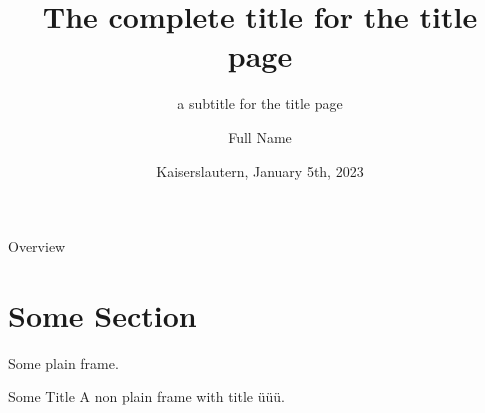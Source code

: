 \documentclass{beamer}
\title[Short Title in Foot]{The complete title for the title page}
\subtitle{a subtitle for the title page}
\date{Kaiserslautern, January 5th, 2023}
\author[Short Name]{Full Name}
\institute[Short Institute]{Full Affiliation}
\begin{document}
\begin{frame}
\titlepage
\end{frame}

\begin{frame}{Overview}
\tableofcontents
\end{frame}

\section{Some Section}
\rptusectionpage %

\begin{frame}[plain]
Some plain frame.
\end{frame}

\begin{frame}{Some Title}
A non plain frame with title üüü.
\end{frame}
\end{document}
